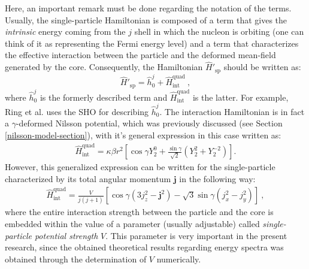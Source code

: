 Here, an important remark must be done regarding the notation of the terms. Usually, the single-particle Hamiltonian is composed of a term that gives the \emph{intrinsic} energy coming from the $j$ shell in which the nucleon is orbiting (one can think of it as representing the Fermi energy level) and a term that characterizes the effective interaction between the particle and the deformed mean-field generated by the core. Consequently, the Hamiltonian $\hat{H}'_\text{sp}$ should be written as: $$\hat{H}'_\text{sp}=\hat{h}_0^j+\hat{H}_\text{int}^\text{quad}\ ,$$where $\hat{h}_0^j$ is the formerly described term and $\hat{H}_\text{int}^\text{quad}$ is the latter.
For example, Ring et al. \cite{ring2004nuclear} uses the SHO for describing $\hat{h}_0^j$. The interaction Hamiltonian is in fact a $\gamma$-deformed Nilsson potential, which was previously discussed (see Section \ref{nilsson-model-section}), with it's general expression in this case written as:
\begin{align}
    \hat{H}_\text{int}^\text{quad}=\kappa\beta r^2\left[\cos\gamma Y_{2}^{0}+\frac{\sin\gamma}{\sqrt{2}}\left(Y_2^2+Y_2^{-2}\right)\right].
    \label{quadrupole-deformed-potential-beta}
\end{align}
However, this generalized expression can be written for the single-particle characterized by its total angular momentum $\mathbf{j}$ in the following way:
\begin{align}
    \hat{H}_\text{int}^\text{quad}=\frac{V}{j(j+1)}\left[\cos\gamma(3j_z^2-\mathbf{j}^2)-\sqrt{3}\sin\gamma(j_x^2-j_y^2)\right]\ ,
    \label{single-particle-nilsson-defored-potential}
\end{align}
where the entire interaction strength between the particle and the core is embedded within the value of a parameter (usually adjustable) called \emph{single-particle potential strength} $V$. This parameter is very important in the present research, since the obtained theoretical results regarding energy spectra was obtained through the determination of $V$ numerically.

